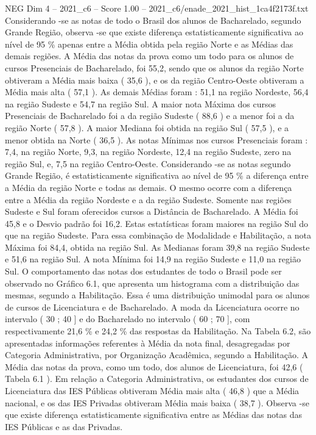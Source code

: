 \begin{textsample}{NEG Dim 4 – 2021\_c6 – Score 1.00 – 2021\_c6/enade\_2021\_hist\_1ca4f2173f.txt}
Considerando -se as notas de todo o Brasil dos alunos de Bacharelado, segundo Grande Região, observa -se que existe diferença estatisticamente significativa ao nível de 95 \% apenas entre a Média obtida pela região Norte e as Médias das demais regiões.
A Média das notas da prova como um todo para os alunos de cursos Presenciais de Bacharelado, foi 55,2, sendo que os alunos da região Norte obtiveram a Média mais baixa ( 35,6 ), e os da região Centro-Oeste obtiveram a Média mais alta ( 57,1 ).
As demais Médias foram : 51,1 na região Nordeste, 56,4 na região Sudeste e 54,7 na região Sul.
A maior nota Máxima dos cursos Presenciais de Bacharelado foi a da região Sudeste ( 88,6 ) e a menor foi a da região Norte ( 57,8 ).
A maior Mediana foi obtida na região Sul ( 57,5 ), e a menor obtida na Norte ( 36,5 ).
As notas Mínimas nos cursos Presenciais foram : 7,4, na região Norte, 9,3, na região Nordeste, 12,4 na região Sudeste, zero na região Sul, e, 7,5 na região Centro-Oeste.
Considerando -se as notas segundo Grande Região, é estatisticamente significativa ao nível de 95 \% a diferença entre a Média da região Norte e todas as demais.
O mesmo ocorre com a diferença entre a Média da região Nordeste e a da região Sudeste.
Somente nas regiões Sudeste e Sul foram oferecidos cursos a Distância de Bacharelado.
A Média foi 45,8 e o Desvio padrão foi 16,2.
Estas estatísticas foram maiores na região Sul do que na região Sudeste.
Para essa combinação de Modalidade e Habilitação, a nota Máxima foi 84,4, obtida na região Sul.
As Medianas foram 39,8 na região Sudeste e 51,6 na região Sul.
A nota Mínima foi 14,9 na região Sudeste e 11,0 na região Sul.
O comportamento das notas dos estudantes de todo o Brasil pode ser observado no Gráfico 6.1, que apresenta um histograma com a distribuição das mesmas, segundo a Habilitação.
Essa é uma distribuição unimodal para os alunos de cursos de Licenciatura e de Bacharelado.
A moda da Licenciatura ocorre no intervalo ( 30 ; 40 ] e do Bacharelado no intervalo ( 60 ; 70 ], com respectivamente 21,6 \% e 24,2 \% das respostas da Habilitação.
Na Tabela 6.2, são apresentadas informações referentes à Média da nota final, desagregadas por Categoria Administrativa, por Organização Acadêmica, segundo a Habilitação.
A Média das notas da prova, como um todo, dos alunos de Licenciatura, foi 42,6 ( Tabela 6.1 ).
Em relação a Categoria Administrativa, os estudantes dos cursos de Licenciatura das IES Públicas obtiveram Média mais alta ( 46,8 ) que a Média nacional, e os das IES Privadas obtiveram Média mais baixa ( 38,7 ).
Observa -se que existe diferença estatisticamente significativa entre as Médias das notas das IES Públicas e as das Privadas.

\end{textsample}
